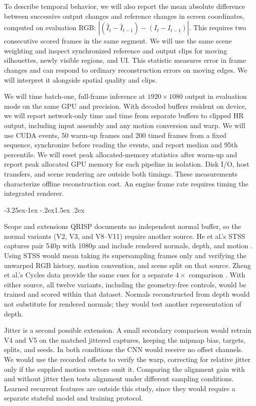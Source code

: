 \documentclass[11pt,a4paper]{article}
\makeatletter
\renewcommand\subsection{\@startsection{subsection}{2}{\z@}%
  {-3.25ex\@plus -1ex \@minus -.2ex}{1.5ex \@plus .2ex}%
  {\normalfont\large\bfseries\raggedright}}
\makeatother
\begin{document}
To describe temporal behavior, we will also report the mean absolute
difference between successive output changes and reference changes in
screen coordinates, computed on evaluation RGB:
$\left|(\hat I_t-\hat I_{t-1})-(I_t-I_{t-1})\right|$.
This requires two consecutive scored frames in the same segment. We will
use the same scene weighting and inspect synchronized reference and
output clips for moving silhouettes, newly visible regions, and UI.
This statistic measures error in frame changes and can respond to
ordinary reconstruction errors on moving edges. We will interpret it
alongside spatial quality and clips.

We will time batch-one, full-frame inference at $1920\times1080$ output
in evaluation mode on the same GPU and precision. With decoded buffers
resident on device, we will report network-only time and time from
separate buffers to clipped HR output, including input assembly and
any motion conversion and warp. We will use CUDA events, 50 warm-up
frames and 200 timed frames from a fixed sequence, synchronize before
reading the events, and report median and 95th percentile. We will
reset peak allocated-memory statistics after warm-up and report peak
allocated GPU memory for each pipeline in isolation. Disk I/O, host
transfers, and scene rendering are outside both timings. These measurements
characterize offline reconstruction cost. An engine frame rate requires
timing the integrated renderer.

\subsection{Scope and extensions}
\label{sec:scope}
QRISP documents no independent normal buffer, so the normal variants
(V2, V3, and V8--V11) require another source. He et al.'s STSS captures
pair 540p with 1080p and include rendered normals, depth, and motion
\cite{he2024stss}. Using STSS would mean taking its supersampling frames
only and verifying the unwarped RGB history, motion convention, and
scene split on that source. Zheng et al.'s Cycles data provide the same
cues for a separate $4\times$ comparison \cite{zheng2025rdg}. With either
source, all twelve variants, including the geometry-free controls, would
be trained and scored within that dataset. Normals reconstructed from
depth would not substitute for rendered normals; they would test another
representation of depth.

Jitter is a second possible extension. A small secondary comparison
would retrain V4 and V5 on the matched jittered captures, keeping the
mipmap bias, targets, splits, and seeds. In both conditions the CNN would
receive no offset channels. We would use the recorded offsets to verify
the warp, correcting for relative jitter only if the supplied motion
vectors omit it. Comparing the alignment gain with and without jitter
then tests alignment under different sampling conditions. Learned
recurrent features are outside this study, since they would require a
separate stateful model and training protocol.
\end{document}
